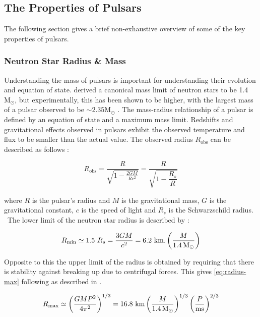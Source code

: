 \subsection{The Properties of Pulsars}

The following section gives a brief non-exhaustive overview of some of the key properties of pulsars. 

\subsubsection{Neutron Star Radius \& Mass}

Understanding the mass of pulsars is important for understanding their evolution and equation of state. \cite{oppenheimer_massive_1939} derived a canonical mass limit of neutron stars to be 1.4 $\mathrm{M_{\odot}}$, but experimentally, this has been shown to be higher, with the largest mass of a pulsar observed to be $\sim 2.35 \mathrm{M_{\odot}}$ \citep{Romani_2022}. The mass-radius relationship of a pulsar is defined by an equation of state and a maximum mass limit. Redshifts and gravitational effects observed in pulsars exhibit the observed temperature and flux to be smaller than the actual value. The observed radius $R_\text{obs}$ can be described as follows \citep[p. 56][]{pulsar_handbook}:

\begin{equation}
    R_\text{obs} = \frac{R}{\sqrt{1 - \frac{2GM}{Rc^2}}} = \frac{R}{ \sqrt{1 - \dfrac{R_s}{R}}}
\end{equation}

where $R$ is the pulsar's radius and $M$ is the gravitational mass, $G$ is the gravitational constant, $c$ is the speed of light and $R_s$ is the Schwarzschild radius. \
The lower limit of the neutron star radius is described by \cite[p. 58][]{pulsar_handbook}: 

\begin{equation}
    R_\text{min} \simeq 1.5 \ R_s = \frac{3GM}{c^2} = 6.2 \ \text{km.} \left( \frac{M}{1.4 \, \text{M}_\odot} \right)
\end{equation}

Opposite to this the upper limit of the radius is obtained by requiring that there is stability against breaking up due to centrifugal forces. This gives \cref{eq:radius-max} following as described in \cite[p.~58]{pulsar_handbook}. 

\begin{equation}
    R_\text{max} \simeq \left(\frac{GMP^2}{4 \pi^2}\right)^{1/3} = 16.8 \ \text{km} \left( \frac{M}{1.4 \, \text{M}_\odot} \right)^{1/3} \left( \frac{P}{\text{ms}} \right)^{2/3}
    \label{eq:radius-max}
\end{equation}

